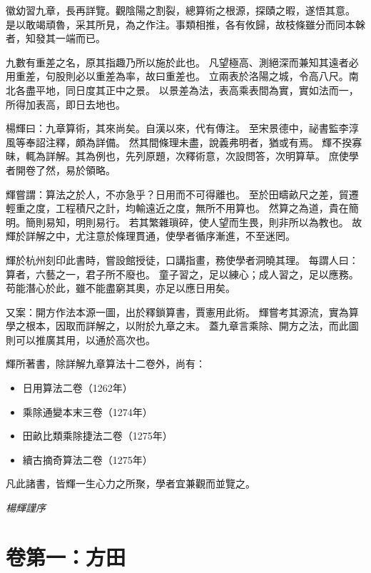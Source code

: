 \documentclass[11pt,a4paper]{article}
\begin{document}
徽幼習九章，長再詳覽。觀陰陽之割裂，總算術之根源，探賾之暇，遂悟其意。
是以敢竭頑魯，采其所見，為之作注。事類相推，各有攸歸，故枝條雖分而同本榦者，知發其一端而已。

九數有重差之名，原其指趣乃所以施於此也。
凡望極高、測絕深而兼知其遠者必用重差，句股則必以重差為率，故曰重差也。
立兩表於洛陽之城，令高八尺。南北各盡平地，同日度其正中之景。
以景差為法，表高乘表間為實，實如法而一，所得加表高，即日去地也。

楊輝曰：九章算術，其來尚矣。自漢以來，代有傳注。
至宋景德中，祕書監李淳風等奉詔注釋，頗為詳備。
然其間條理未盡，說義弗明者，猶或有焉。
輝不揆寡昧，輒為詳解。其為例也，先列原題，次釋術意，次設問答，次明算草。
庶使學者開卷了然，易於領略。

輝嘗謂：算法之於人，不亦急乎？日用而不可得離也。
至於田疇畝尺之差，貿遷輕重之度，工程積尺之計，均輸遠近之度，無所不用算也。
然算之為道，貴在簡明。簡則易知，明則易行。
若其繁雜瑣碎，使人望而生畏，則非所以為教也。
故輝於詳解之中，尤注意於條理貫通，使學者循序漸進，不至迷罔。

輝於杭州刻印此書時，嘗設館授徒，口講指畫，務使學者洞曉其理。
每謂人曰：算者，六藝之一，君子所不廢也。
童子習之，足以練心；成人習之，足以應務。
苟能潛心於此，雖不能盡窮其奧，亦足以應日用矣。

又案：開方作法本源一圖，出於釋鎖算書，賈憲用此術。
輝嘗考其源流，實為算學之根本，因取而詳解之，以附於九章之末。
蓋九章言乘除、開方之法，而此圖則可以推廣其用，以通於高次也。

輝所著書，除詳解九章算法十二卷外，尚有：
\begin{itemize}[leftmargin=2em]
\item 日用算法二卷（1262年）
\item 乘除通變本末三卷（1274年）
\item 田畝比類乘除捷法二卷（1275年）
\item 續古摘奇算法二卷（1275年）
\end{itemize}

凡此諸書，皆輝一生心力之所聚，學者宜兼觀而並覽之。

\begin{flushright}
\textit{楊輝謹序}
\end{flushright}

\newpage

\section{卷第一：方田}
\label{sec:fangtian}
\end{document}
